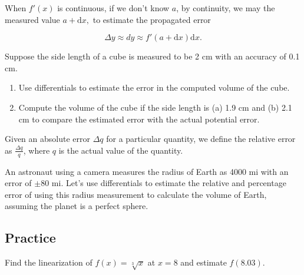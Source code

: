 \begin{remark}

\begin{remark}

When \(f'(x)\) is continuous, if we don't know \(a\), by continuity, we
may the measured value \(a+\mathrm{d}x,\) to estimate the propagated
error

\[
\Delta y\approx dy\approx f'(a+\mathrm{d}x)\mathrm{d}x.
\]

\end{remark}

\end{remark}

\begin{example}

Suppose the side length of a cube is measured to be 2 cm with an
accuracy of 0.1 cm.

\begin{enumerate}
\item
  Use differentials to estimate the error in the computed volume of the
  cube.
\item
  Compute the volume of the cube if the side length is (a) 1.9 cm and
  (b) 2.1 cm to compare the estimated error with the actual potential
  error.
\end{enumerate}

Given an absolute error \(\Delta q\) for a particular quantity, we
define the relative error as \(\frac{\Delta q}{q}\), where \(q\) is the
actual value of the quantity.

\end{example}

\begin{example}

An astronaut using a camera measures the radius of Earth as 4000 mi with
an error of \(\pm 80\) mi. Let's use differentials to estimate the relative
and percentage error of using this radius measurement to calculate the
volume of Earth, assuming the planet is a perfect sphere.

\end{example}
\vspace*{6\baselineskip}

\subsection{Practice}

\begin{exercise}

Find the linearization of \(f(x)=\sqrt[3]{x}\) at \(x=8\) and estimate
\(f(8.03)\).

\end{exercise}
\vspace*{6\baselineskip}

